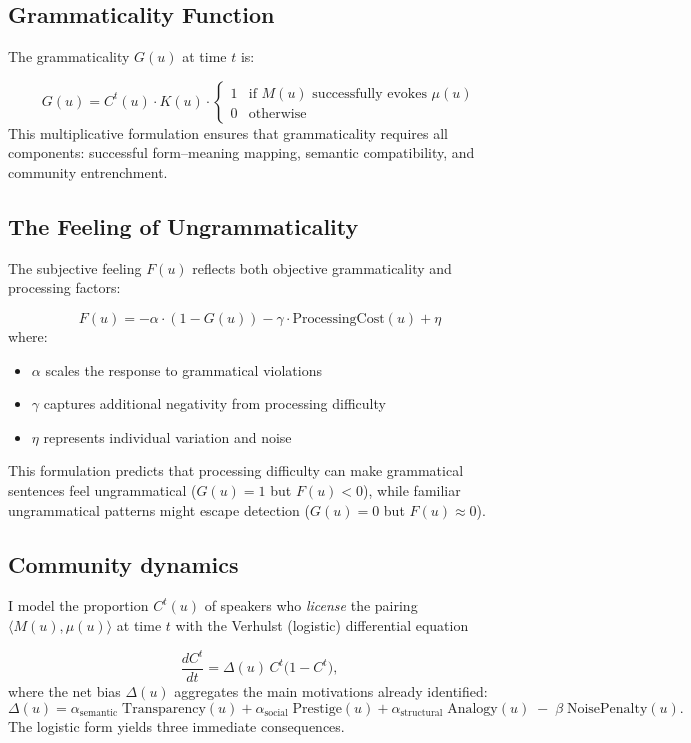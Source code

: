 \documentclass[12pt,letterpaper]{article}
\begin{document}
\subsection{Grammaticality Function}

The grammaticality $G(u)$ at time $t$ is:

\[
G(u) = C^t(u) \cdot K(u) \cdot \begin{cases}
1 & \text{if } M(u) \text{ successfully evokes } \mu(u) \\
0 & \text{otherwise}
\end{cases}
\]
This multiplicative formulation ensures that grammaticality requires all components: successful form--meaning mapping, semantic compatibility, and community entrenchment.

\subsection{The Feeling of Ungrammaticality}

The subjective feeling $F(u)$ reflects both objective grammaticality and processing factors:

\[
F(u) = -\alpha \cdot (1 - G(u)) - \gamma \cdot \text{ProcessingCost}(u) + \eta
\]
where:
\begin{itemize}
    \item $\alpha$ scales the response to grammatical violations
    \item $\gamma$ captures additional negativity from processing difficulty
    \item $\eta$ represents individual variation and noise
\end{itemize}
This formulation predicts that processing difficulty can make grammatical sentences feel ungrammatical ($G(u) = 1$ but $F(u) < 0$), while familiar ungrammatical patterns might escape detection ($G(u) = 0$ but $F(u) \approx 0$).



\subsection{Community dynamics}\label{sec:community-dynamics}

I model the proportion $C^{t}(u)$ of speakers who \emph{license} the pairing $\langle M(u),\mu(u)\rangle$ at time $t$ with the Verhulst (logistic) differential equation

\begin{equation}\label{eq:logistic}
\frac{dC^{t}}{dt}= \Delta(u)\,C^{t}\bigl(1-C^{t}\bigr),
\end{equation}
where the net bias $\Delta(u)$ aggregates the main motivations already
identified:
\[
\Delta(u)=
  \alpha_{\text{semantic}}\;\text{Transparency}(u)
  +\alpha_{\text{social}}\;\text{Prestige}(u)
  +\alpha_{\text{structural}}\;\text{Analogy}(u)
  \;-\;\beta\;\text{NoisePenalty}(u).
\]
The logistic form yields three immediate consequences.
\end{document}
